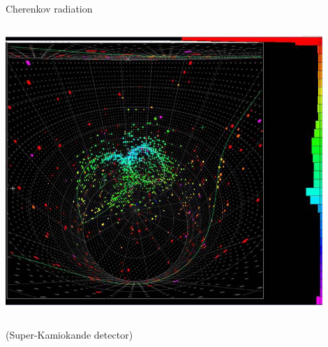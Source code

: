 \begin{frame}{Cherenkov radiation}
\begin{columns}
\begin{column}{0.60\textwidth}
\begin{center}
      \includegraphics[width=0.90\textwidth]{./images/photos/superk_event_display.jpg}\\
    \end{center}
  \end{column}
\end{columns}

(Super-Kamiokande detector)

\end{frame}


%
%
%

